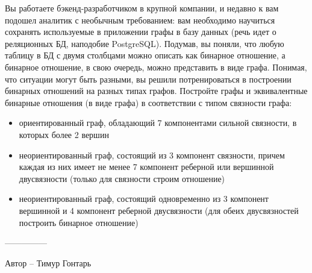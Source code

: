 \question
Вы работаете бэкенд-разработчиком в крупной компании, и недавно к вам подошел аналитик с необычным требованием: вам необходимо научиться сохранять используемые в приложении графы в базу данных (речь идет о реляционных БД, наподобие PostgreSQL). Подумав, вы поняли, что любую таблицу в БД с двумя столбцами можно описать как бинарное отношение, а бинарное отношение, в свою очередь, можно представить в виде графа. Понимая, что ситуации могут быть разными, вы решили потренироваться в построении бинарных отношений на разных типах графов. Постройте графы и эквивалентные бинарные отношения (в виде графа) в соответствии с типом связности графа:

\begin{itemize}
\item ориентированный граф, обладающий 7 компонентами сильной связности, в которых более 2 вершин
\item неориентированный граф, состоящий из 3 компонент связности, причем каждая из них имеет не менее 7 компонент реберной или вершинной двусвязности (только для связности строим отношение)
\item неориентированный граф, состоящий одновременно из 3 компонент вершинной и 4 компонент реберной двусвязности (для обеих двусвязностей построить бинарное отношение)
\end{itemize}

---------------

Автор -- Тимур Гонтарь